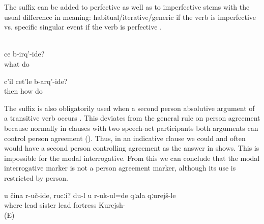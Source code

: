 The suffix can be added to perfective as well as to imperfective stems with the usual difference in meaning: habitual/iterative/generic if the verb is imperfective  vs. specific singular event if the verb is perfective .
%
\begin{exe}
	\ex	{} \label{ex:What shouldcan we do} \\
	\gll	ce	b-irq'-ide?\\
		what	do\\
	\glt	{}

	\ex	\label{ex:‎Then how should I make (the plough)}
	\gll	c'il	cet'le	b-arq'-ide?\\
		then	how	do\\
	\glt	{}
\end{exe}

The suffix is also obligatorily used when a second person absolutive argument of a transitive verb occurs . This deviates from the general rule on person agreement because normally in clauses with two speech-act participants both arguments can control person agreement (). Thus, in an indicative clause we could and often would have a second person controlling agreement as the answer in  shows. This is impossible for the modal interrogative. From this we can conclude that the modal interrogative marker is not a person agreement marker, although its use is restricted by person.
%
\begin{exe}
	\ex	\label{ex:Where should I bring you, sister}
	\gll	u	čina	r-uč-ide,	rucːi?	du-l u r-uk-ul=de qːala qːurejš-le\\
			where	lead	sister	  lead	fortress	Kurejsh-\\
	\glt	{} (E)
\end{exe}

